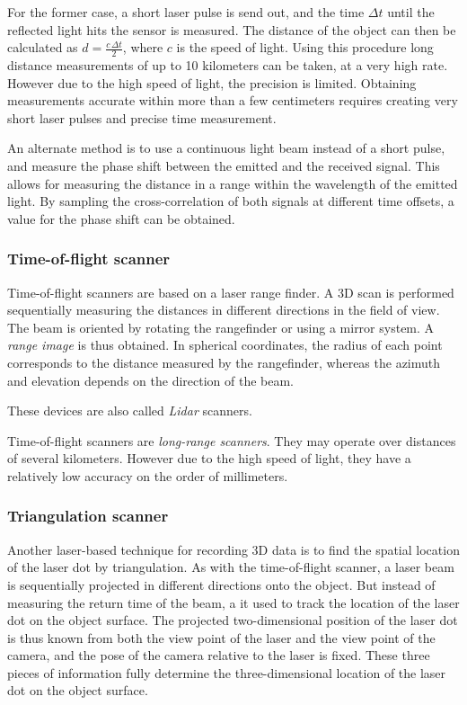For the former case, a short laser pulse is send out, and the time $\Delta t$ until the reflected light hits the sensor is measured. The distance of the object can then be calculated as $d = \frac{c \, \Delta t}{2}$, where $c$ is the speed of light. Using this procedure long distance measurements of up to 10 kilometers can be taken, at a very high rate. However due to the high speed of light, the precision is limited. Obtaining measurements accurate within more than a few centimeters requires creating very short laser pulses and precise time measurement.

An alternate method is to use a continuous light beam instead of a short pulse, and measure the phase shift between the emitted and the received signal. This allows for measuring the distance in a range within the wavelength of the emitted light. By sampling the cross-correlation of both signals at different time offsets, a value for the phase shift can be obtained.

\subsubsection{Time-of-flight scanner}
Time-of-flight scanners are based on a laser range finder. A 3D scan is performed sequentially measuring the distances in different directions in the field of view. The beam is oriented by rotating the rangefinder or using a mirror system. A \emph{range image} is thus obtained. In spherical coordinates, the radius of each point corresponds to the distance measured by the rangefinder, whereas the azimuth and elevation depends on the direction of the beam. 

These devices are also called \emph{Lidar} scanners.

Time-of-flight scanners are \emph{long-range scanners}. They may operate over distances of several kilometers. However due to the high speed of light, they have a relatively low accuracy on the order of millimeters.

\subsubsection{Triangulation scanner}
Another laser-based technique for recording 3D data is to find the spatial location of the laser dot by triangulation. As with the time-of-flight scanner, a laser beam is sequentially projected in different directions onto the object. But instead of measuring the return time of the beam, a it used to track the location of the laser dot on the object surface. The projected two-dimensional position of the laser dot is thus known from both the view point of the laser and the view point of the camera, and the pose of the camera relative to the laser is fixed. These three pieces of information fully determine the three-dimensional location of the laser dot on the object surface.



